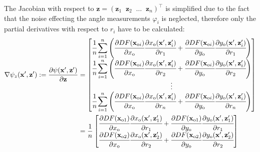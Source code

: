 The Jacobian with respect to $\mathbf{z} = (\mathbf{z}_1\;\;\mathbf{z}_2\;\; \dots \;\; \mathbf{z}_n)^{\top}$ is simplified due to the fact that the noise effecting the
angle measurements $\varphi_i$ is neglected, therefore only the partial derivatives with respect to $r_i$ have to
be calculated:
\begin{align}
    \nabla\psi_z(\mathbf{x}',\mathbf{z}') := \frac{\partial \psi(\mathbf{x}',\mathbf{z}')}{\partial \mathbf{z}}
     & =
    \begin{bmatrix}
        \cfrac{1}{n}\displaystyle\sum\limits_{i=1}^{n}\left(\cfrac{\partial DF(\mathbf{x}_{\text{o}i})}{\partial x_{\text{o}}}\cfrac{\partial x_{\text{o}}(\mathbf{x}',\mathbf{z}'_i)}{\partial r_1}
        + \cfrac{\partial DF(\mathbf{x}_{\text{o}i})}{\partial y_{\text{o}}}\cfrac{\partial y_{\text{o}}(\mathbf{x}',\mathbf{z}'_i)}{\partial r_1}\right) \\
        \cfrac{1}{n}\displaystyle\sum\limits_{i=1}^{n}\left(\cfrac{\partial DF(\mathbf{x}_{\text{o}i})}{\partial x_{\text{o}}}\cfrac{\partial x_{\text{o}}(\mathbf{x}',\mathbf{z}'_i)}{\partial r_2}
        + \cfrac{\partial DF(\mathbf{x}_{\text{o}i})}{\partial y_{\text{o}}}\cfrac{\partial y_{\text{o}}(\mathbf{x}',\mathbf{z}'_i)}{\partial r_2}\right) \\
        \vdots                                                                                                                                            \\
        \cfrac{1}{n}\displaystyle\sum\limits_{i=1}^{n}\left(\cfrac{\partial DF(\mathbf{x}_{\text{o}i})}{\partial x_{\text{o}}}\cfrac{\partial x_{\text{o}}(\mathbf{x}',\mathbf{z}'_i)}{\partial r_n}
        + \cfrac{\partial DF(\mathbf{x}_{\text{o}i})}{\partial y_{\text{o}}}\cfrac{\partial y_{\text{o}}(\mathbf{x}',\mathbf{z}'_i)}{\partial r_n}\right) \\
    \end{bmatrix} \nonumber \\
     & =
    \frac{1}{n}
    \begin{bmatrix}
        \cfrac{\partial DF(\mathbf{x}_{\text{o}1})}{\partial x_{\text{o}}}\cfrac{\partial x_{\text{o}}(\mathbf{x}',\mathbf{z}'_1)}{\partial r_1}
        + \cfrac{\partial DF(\mathbf{x}_{\text{o}1})}{\partial y_{\text{o}}}\cfrac{\partial y_{\text{o}}(\mathbf{x}',\mathbf{z}'_1)}{\partial r_1} \\
        \cfrac{\partial DF(\mathbf{x}_{\text{o}2})}{\partial x_{\text{o}}}\cfrac{\partial x_{\text{o}}(\mathbf{x}',\mathbf{z}'_2)}{\partial r_2}
        + \cfrac{\partial DF(\mathbf{x}_{\text{o}2})}{\partial y_{\text{o}}}\cfrac{\partial y_{\text{o}}(\mathbf{x}',\mathbf{z}'_2)}{\partial r_2} \\

\end{bmatrix}
\end{align}
